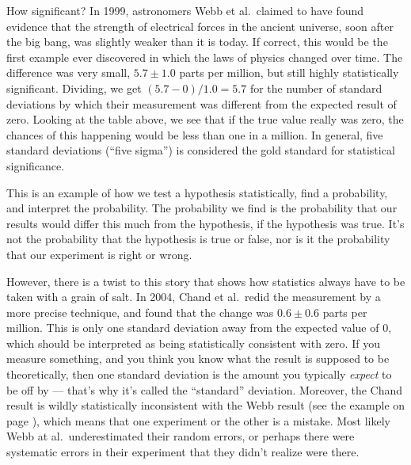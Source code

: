 
\begin{eg}{How significant?}\label{eg:fine-structure}
In 1999, astronomers Webb et al.~claimed to have found evidence that the strength of electrical forces in the ancient universe,
soon after the big bang, was slightly weaker than it is today. If correct, this would be the first example ever discovered in which
the laws of physics changed over time. The difference was very small, $5.7\pm1.0$ parts per million, but still highly statistically
significant. Dividing, we get $(5.7-0)/1.0=5.7$ for the number of standard deviations by which their measurement was different from the
expected result of zero. Looking at the table above, we see that if the true value really was zero, the chances of this happening would
be less than one in a million. In general, five standard deviations (``five sigma'') is considered the gold standard for statistical
significance.

This is an example of how we test a hypothesis statistically, find a probability, and interpret the probability.
The probability we find is the probability that our results would differ this much from the hypothesis, if the
hypothesis was true. It's not the probability that the hypothesis is true or false, nor is it the probability
that our experiment is right or wrong.

However, there is a twist to this story that shows how statistics always have to be taken with a grain of salt.
In 2004, Chand et al.~redid the measurement by a more precise technique, and found that the change was $0.6\pm 0.6$ parts per million.
This is only one standard deviation away from the expected value of 0, which should be interpreted as being statistically consistent
with zero. If you measure something, and you think you know what the result is supposed to be theoretically, then one standard
deviation is the amount you typically \emph{expect} to be off by --- that's why it's called the ``standard'' deviation. Moreover,
the Chand result is wildly statistically inconsistent with the Webb result (see the example on page \pageref{eg:difference-between-measurements}),
which means that one experiment or the other is
a mistake. Most likely Webb at al.~underestimated their random errors, or perhaps there were systematic errors in their experiment
that they didn't realize were there.
\end{eg}

